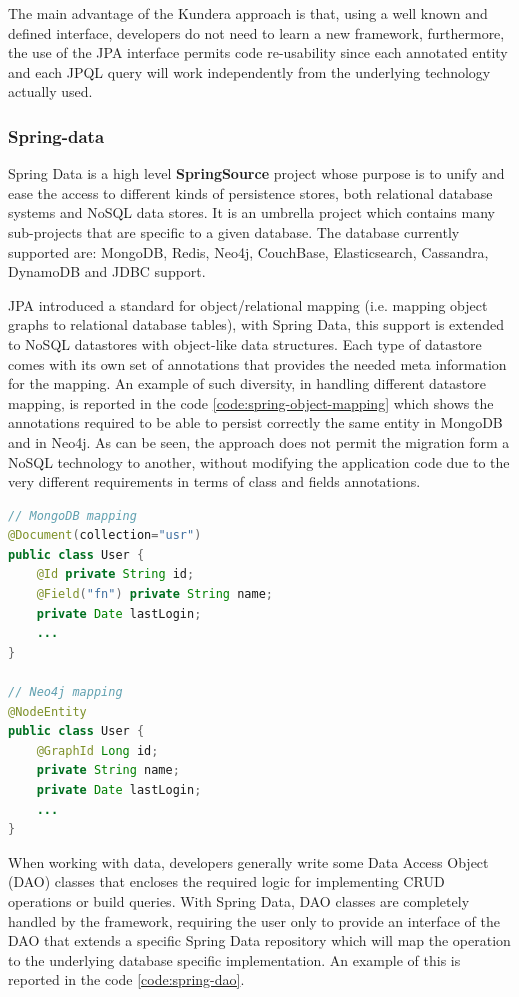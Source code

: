 \noindent The main advantage of the Kundera approach is that, using a well known and defined interface, developers do not need to learn a new framework, furthermore, the use of the JPA interface permits code re-usability since each annotated entity and each JPQL query will work independently from the underlying technology actually used.

\subsubsection{Spring-data}
Spring Data \cite{online:spring-data} is a high level \textbf{SpringSource} project whose purpose is to unify and ease the access to different kinds of persistence stores, both relational database systems and NoSQL data stores. It is an umbrella project which contains many sub-projects that are specific to a given database. The database currently supported are: MongoDB, Redis, Neo4j, CouchBase, Elasticsearch, Cassandra, DynamoDB and JDBC support.

\noindent JPA introduced a standard for object/relational mapping (i.e. mapping object graphs to relational database tables), with Spring Data, this support is extended to NoSQL datastores with object-like data structures.
Each type of datastore comes with its own set of annotations that provides the needed meta information for the mapping. An example of such diversity, in handling different datastore mapping, is reported in the code \ref{code:spring-object-mapping} which shows the annotations required to be able to persist correctly the same entity in MongoDB and in Neo4j. As can be seen, the approach does not permit the migration form a NoSQL technology to another, without modifying the application code due to the very different requirements in terms of class and fields annotations.

\begin{lstlisting}[language=Java, caption=Spring Data object mapping, label=code:spring-object-mapping]
// MongoDB mapping
@Document(collection="usr")
public class User {
    @Id private String id;
    @Field("fn") private String name;
    private Date lastLogin;
    ...
}

// Neo4j mapping
@NodeEntity
public class User {
    @GraphId Long id;
    private String name;
    private Date lastLogin;
    ...
}
\end{lstlisting}

\noindent When working with data, developers generally write some Data Access Object (DAO) classes that encloses the required logic for implementing CRUD operations or build queries.
With Spring Data, DAO classes are completely handled by the framework, requiring the user only to provide an interface of the DAO that extends a specific Spring Data repository which will map the operation to the underlying database specific implementation.
An example of this is reported in the code \ref{code:spring-dao}.

